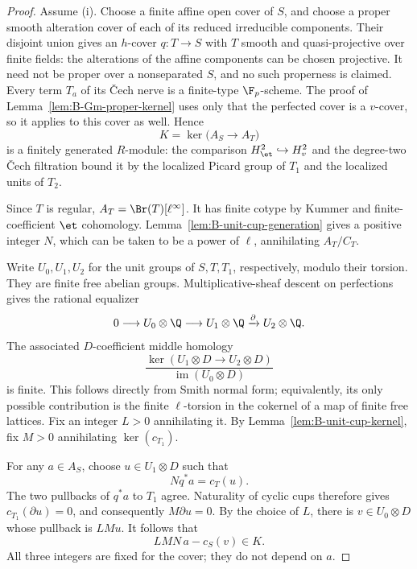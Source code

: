 \begin{proof}
Assume (i).  Choose a finite affine open cover of \(S\),
and choose a proper smooth alteration cover of each of its
reduced irreducible components.  Their disjoint union gives
an \(h\)-cover \(q:T\to S\) with \(T\) smooth and
quasi-projective over finite fields: the alterations of the
affine components can be chosen projective.  It need not be proper over a
nonseparated \(S\), and no such properness is claimed.
Every term \(T_a\) of its \v Cech nerve is a finite-type
\(\F_p\)-scheme.  The proof of
Lemma~\ref{lem:B-Gm-proper-kernel} uses only that the
perfected cover is a \(v\)-cover, so it applies to this
cover as well.  Hence
\[
 K=\ker\bigl(A_S\longrightarrow A_T\bigr)
\]
is a finitely generated \(R\)-module: the comparison
\(H^2_{\et}\hookrightarrow H^2_v\) and the degree-two
\v Cech filtration bound it by the localized Picard group
of \(T_1\) and the localized units of \(T_2\).

Since \(T\) is regular, \(A_T=\Br(T)[\ell^\infty]\).
It has finite cotype by Kummer and finite-coefficient \(\et\)
cohomology.  Lemma~\ref{lem:B-unit-cup-generation} gives
a positive integer \(N\), which can be taken to be a
power of \(\ell\), annihilating \(A_T/C_T\).

Write \(U_0,U_1,U_2\) for the unit groups of
\(S,T,T_1\), respectively, modulo their torsion.
They are finite free abelian groups.  Multiplicative-sheaf
descent on perfections gives the rational equalizer
\[
 0\longrightarrow U_0\otimes\Q
   \longrightarrow U_1\otimes\Q
   \xrightarrow{\partial}U_2\otimes\Q.
\]
The associated \(D\)-coefficient middle homology
\[
 \frac{\ker(U_1\otimes D\to U_2\otimes D)}
             {\operatorname{im}(U_0\otimes D)}
\]
is finite.  This follows directly from Smith normal form;
equivalently, its only possible contribution is the finite
\(\ell\)-torsion in the cokernel of a map of finite
free lattices.  Fix an integer \(L>0\) annihilating it.
By Lemma~\ref{lem:B-unit-cup-kernel}, fix \(M>0\)
annihilating \(\ker(c_{T_1})\).

For any \(a\in A_S\), choose \(u\in U_1\otimes D\)
such that
\[
             Nq^*a=c_T(u).
\]
The two pullbacks of \(q^*a\) to \(T_1\) agree.
Naturality of cyclic cups therefore gives
\(c_{T_1}(\partial u)=0\), and consequently
\(M\partial u=0\).  By the choice of \(L\), there
is \(v\in U_0\otimes D\) whose pullback is \(LMu\).
It follows that
\begin{equation}
        LMN\,a-c_S(v)\in K.
 \label{eq:B-global-unit-finite-error}
\end{equation}
All three integers are fixed for the cover; they do not
depend on \(a\).


\end{proof}
